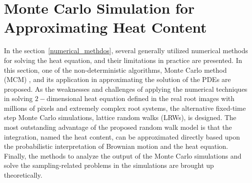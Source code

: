 \section{Monte Carlo Simulation for Approximating Heat Content}

In the section~\ref{numerical_methdos}, several generally utilized
numerical methods \cite{grossmann2007numerical}\cite{zlamal1968finite}
\cite{eymard2000finite} \cite{attaway1991boundary} for solving the
heat equation, and their limitations in practice are presented. In
this section, one of the non-deterministic algorithms, Monte Carlo
method (MCM) \cite{rubinstein2016simulation} \cite{kroese2014monte},
and its application in approximating the solution of the PDEs are
proposed. As the weaknesses and challenges of applying the numerical
techniques in solving $2-$dimensional heat equation defined in the
real root images with millions of pixels and extremely complex root
systems, the alternative fixed-time step Monte Carlo simulations,
lattice random walks (LRWs), is designed. The most outstanding
advantage of the proposed random walk model is that the integration,
named the heat content, can be approximated directly based upon the
probabilistic interpretation of Brownian motion and the heat equation.
Finally, the methods to analyze the output of the Monte Carlo
simulations and solve the sampling-related problems in the simulations
are brought up theoretically.



